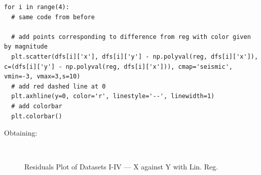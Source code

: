 \documentclass[11pt,a4paper]{article}
\begin{document}
\begin{lstlisting}
for i in range(4):
  # same code from before
  
  # add points corresponding to difference from reg with color given by magnitude
  plt.scatter(dfs[i]['x'], dfs[i]['y'] - np.polyval(reg, dfs[i]['x']), c=(dfs[i]['y'] - np.polyval(reg, dfs[i]['x'])), cmap='seismic', vmin=-3, vmax=3,s=10)
  # add red dashed line at 0
  plt.axhline(y=0, color='r', linestyle='--', linewidth=1)
  # add colorbar
  plt.colorbar()
\end{lstlisting}
Obtaining:
\begin{figure}[ht]
\centering
{}\qquad
{}\\
\qquad%
%
\caption{Residuals Plot of Datasets I-IV — X against Y with Lin. Reg.}
\label{fig:rplots}
\end{figure}
\end{document}
